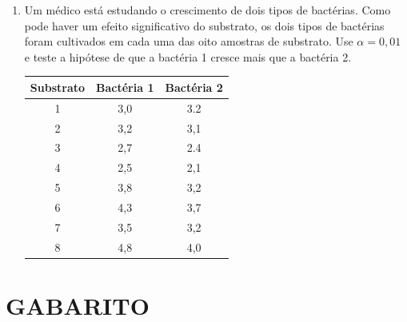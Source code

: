 \documentclass[12pt, a4paper]{article}
\begin{document}
\begin{enumerate}
\item Um médico está estudando o crescimento de dois tipos de bactérias. Como pode haver um efeito significativo do substrato, os dois tipos de bactérias foram cultivados em cada uma das oito amostras de substrato. Use $\alpha=0,01$ e teste a hipótese de que a bactéria 1 cresce mais que a bactéria 2.
\begin{center}
\begin{tabular}{|c|c|c|}
\hline
\textbf{Substrato} & \textbf{Bactéria 1} & \textbf{Bactéria 2} \\
\hline
1 & 3,0 & 3.2 \\
2 & 3,2 & 3,1 \\
3 & 2,7 & 2.4 \\
4 & 2,5 & 2,1 \\
5 & 3,8 & 3,2 \\
6 & 4,3 & 3,7 \\
7 & 3,5 & 3,2 \\
8 & 4,8 & 4,0 \\
\hline
\end{tabular}
\end{center}

\end{enumerate}

\hrulefill

\section*{GABARITO}
\end{document}

